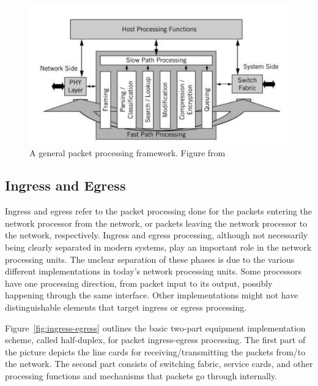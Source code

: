 \begin{figure}[]
  \begin{center}
    \includegraphics[width=\textwidth]{images/general-packet-processing-framework.png}
    \caption{A general packet processing framework. Figure from~\cite{Giladi:2008:Network}}
    \label{fig:general-packet-processing-framework}
  \end{center}
\end{figure}

\subsection{Ingress and Egress}
Ingress and egress refer to the packet processing done for the packets entering the network processor from the network, or packets leaving the network processor to the network, respectively. Ingress and egress processing, although not necessarily being clearly separated in modern systems, play an important role in the network processing units. The unclear separation of these phases is due to the various different implementations in today's network processing units. Some processors have one processing direction, from packet input to its output, possibly happening through the same interface. Other implementations might not have distinguishable elements that target ingress or egress processing.~\cite{Giladi:2008:Network}

Figure~\ref{fig:ingress-egress} outlines the basic two-part equipment implementation scheme, called half-duplex, for packet ingress-egress processing. The first part of the picture depicts the line cards for receiving/transmitting the packets from/to the network. The second part consists of switching fabric, service cards, and other processing functions and mechanisms that packets go through internally.

